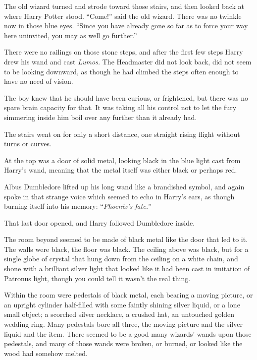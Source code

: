 The old wizard turned and strode toward those stairs, and then looked back at where Harry Potter stood. “Come!” said the old wizard. There was no twinkle now in those blue eyes. “Since you have already gone so far as to force your way here uninvited, you may as well go further.”

\later

There were no railings on those stone steps, and after the first few steps Harry drew his wand and cast \emph{Lumos.} The Headmaster did not look back, did not seem to be looking downward, as though he had climbed the steps often enough to have no need of vision.

The boy knew that he should have been curious, or frightened, but there was no spare brain capacity for that. It was taking all his control not to let the fury simmering inside him boil over any further than it already had.

The stairs went on for only a short distance, one straight rising flight without turns or curves.

At the top was a door of solid metal, looking black in the blue light cast from Harry’s wand, meaning that the metal itself was either black or perhaps red.

Albus Dumbledore lifted up his long wand like a brandished symbol, and again spoke in that strange voice which seemed to echo in Harry’s ears, as though burning itself into his memory: “\emph{Phoenix’s fate.}”

That last door opened, and Harry followed Dumbledore inside.

The room beyond seemed to be made of black metal like the door that led to it. The walls were black, the floor was black. The ceiling above was black, but for a single globe of crystal that hung down from the ceiling on a white chain, and shone with a brilliant silver light that looked like it had been cast in imitation of Patronus light, though you could tell it wasn’t the real thing.

Within the room were pedestals of black metal, each bearing a moving picture, or an upright cylinder half-filled with some faintly shining silver liquid, or a lone small object; a scorched silver necklace, a crushed hat, an untouched golden wedding ring. Many pedestals bore all three, the moving picture and the silver liquid and the item. There seemed to be a good many wizards’ wands upon those pedestals, and many of those wands were broken, or burned, or looked like the wood had somehow melted.

